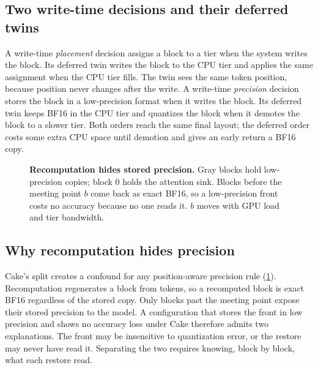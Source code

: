 \documentclass[conference]{IEEEtran}
\begin{document}
\subsection{Two write-time decisions and their deferred twins}\label{sec:bg-twins}
A write-time \emph{placement} decision assigns a block to a tier when the system writes the block.
Its deferred twin writes the block to the CPU tier and applies the same assignment when the CPU tier fills.
The twin sees the same token position, because position never changes after the write.
A write-time \emph{precision} decision stores the block in a low-precision format when it writes the block.
Its deferred twin keeps BF16 in the CPU tier and quantizes the block when it demotes the block to a slower tier.
Both orders reach the same final layout; the deferred order costs some extra CPU space until demotion and gives an early return a BF16 copy.

\begin{figure}[t]
\centering
{}
\caption{\textbf{Recomputation hides stored precision.} Gray blocks hold low-precision copies; block 0 holds the attention sink. Blocks before the meeting point $b$ come back as exact BF16, so a low-precision front costs no accuracy because no one reads it. $b$ moves with GPU load and tier bandwidth.}
\label{fig:concept}
\end{figure}

\subsection{Why recomputation hides precision}\label{sec:bg-hide}
Cake's split creates a confound for any position-aware precision rule (\cref{fig:concept}).
Recomputation regenerates a block from tokens, so a recomputed block is exact BF16 regardless of the stored copy.
Only blocks past the meeting point expose their stored precision to the model.
A configuration that stores the front in low precision and shows no accuracy loss under Cake therefore admits two explanations.
The front may be insensitive to quantization error, or the restore may never have read it.
Separating the two requires knowing, block by block, what each restore read.
\end{document}
